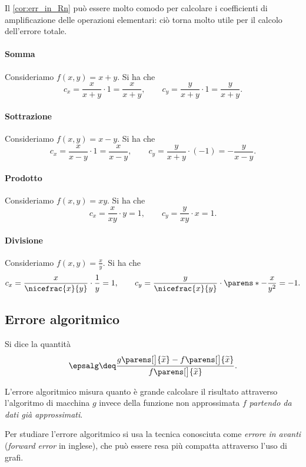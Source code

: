 Il \autoref{cor:err_in_Rn} può essere molto comodo per calcolare i coefficienti di amplificazione delle operazioni elementari: ciò torna molto utile per il calcolo dell'errore totale.

\paragraph{Somma} Consideriamo $f(x, y) = x + y$. Si ha che \[
    c_x = \frac{x}{x+y}\cdot 1 = \frac{x}{x+y}, \qquad c_y = \frac{y}{x+y} \cdot 1 = \frac{y}{x+y}.
\] 
\paragraph{Sottrazione} Consideriamo $f(x, y) = x - y$. Si ha che \[
    c_x = \frac{x}{x-y}\cdot 1 = \frac{x}{x-y}, \qquad c_y = \frac{y}{x+y} \cdot (-1) = -\frac{y}{x-y}.
\] 
\paragraph{Prodotto} Consideriamo $f(x, y) = xy$. Si ha che \[
    c_x = \frac{x}{xy}\cdot y = 1, \qquad c_y = \frac{y}{xy} \cdot x = 1.
\] 
\paragraph{Divisione} Consideriamo $f(x, y) = \frac{x}{y}$. Si ha che \[
    c_x = \frac{x}{\nicefrac{x}{y}} \cdot \frac{1}{y} = 1, \qquad c_y = \frac{y}{\nicefrac{x}{y}} \cdot \parens*{-\frac{x}{y^2}} = -1.
\] 

\subsection{Errore algoritmico}

\begin{definition}
    Si dice  la quantità \[
        \epsalg \deq \frac{g\parens[\big]{\tilde x} - f\parens[\big]{\tilde x}}{f\parens[\big]{\tilde x}}.
    \]
\end{definition}

L'errore algoritmico misura quanto è grande calcolare il risultato attraverso l'algoritmo di macchina $g$ invece della funzione non approssimata $f$ \emph{partendo da dati già approssimati}.

Per studiare l'errore algoritmico si usa la tecnica conosciuta come \emph{errore in avanti} (\emph{forward error} in inglese), che può essere resa più compatta attraverso l'uso di grafi.

